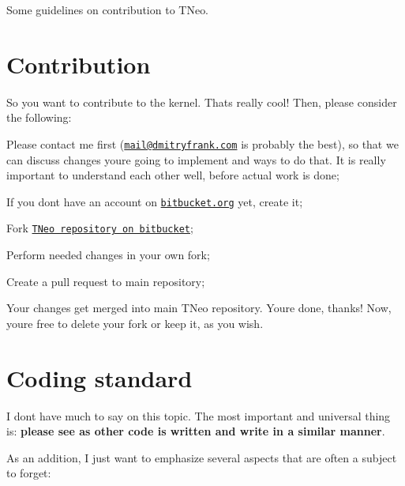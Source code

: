 Some guidelines on contribution to T\+Neo.\hypertarget{contribution_contribution_main}{}\section{Contribution}\label{contribution_contribution_main}
So you want to contribute to the kernel. That\textquotesingle{}s really cool! Then, please consider the following\+:


\begin{DoxyItemize}
\item Please contact me first (\href{mailto:mail@dmitryfrank.com}{\tt mail@dmitryfrank.\+com} is probably the best), so that we can discuss changes you\textquotesingle{}re going to implement and ways to do that. It is really important to understand each other well, before actual work is done;
\item If you don\textquotesingle{}t have an account on \href{http://bitbucket.org}{\tt bitbucket.\+org} yet, create it;
\item Fork \href{https://bitbucket.org/dfrank/tneokernel}{\tt T\+Neo repository on bitbucket};
\item Perform needed changes in your own fork;
\item Create a pull request to main repository;
\item Your changes get merged into main T\+Neo repository. You\textquotesingle{}re done, thanks! Now, you\textquotesingle{}re free to delete your fork or keep it, as you wish.
\end{DoxyItemize}\hypertarget{contribution_contribution_coding_standard}{}\section{Coding standard}\label{contribution_contribution_coding_standard}
I don\textquotesingle{}t have much to say on this topic. The most important and universal thing is\+: {\bfseries please see as other code is written and write in a similar manner}.

As an addition, I just want to emphasize several aspects that are often a subject to forget\+:


